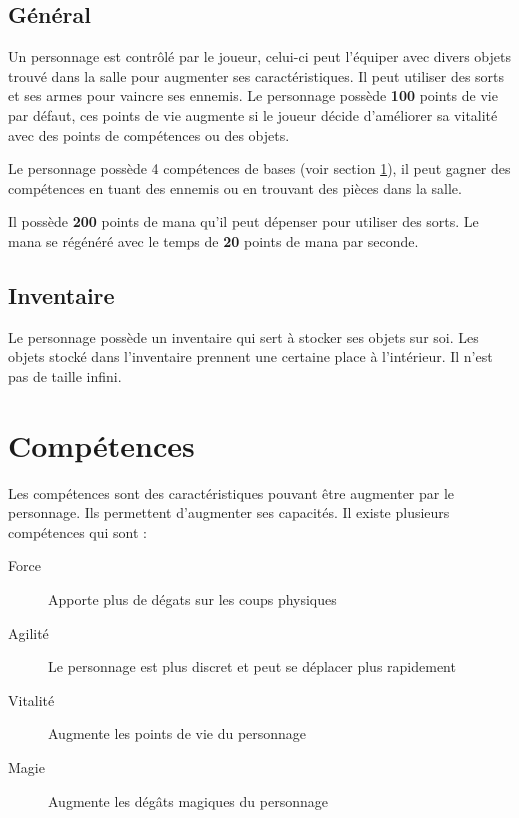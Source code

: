 \documentclass[11pt, a4paper, oneside]{report}
\begin{document}
\subsection{Général}
Un personnage est contrôlé par le joueur, celui-ci peut l'équiper avec divers objets trouvé dans la salle pour augmenter ses caractéristiques. Il peut utiliser des sorts et ses armes pour vaincre ses ennemis. Le personnage possède \textbf{100} points de vie par défaut, ces points de vie augmente si le joueur décide d'améliorer sa vitalité avec des points de compétences ou des objets.

Le personnage possède 4 compétences de bases (voir section \ref{sec:competences}), il peut gagner des compétences en tuant des ennemis ou en trouvant des pièces dans la salle.

Il possède \textbf{200} points de mana qu'il peut dépenser pour utiliser des sorts. Le mana se régénéré avec le temps de \textbf{20} points de mana par seconde. 
\subsection{Inventaire}
Le personnage possède un inventaire qui sert à stocker ses objets sur soi. Les objets stocké dans l'inventaire prennent une certaine place à l'intérieur. Il n'est pas de taille infini.
\section{Compétences}
\label{sec:competences}
Les compétences sont des caractéristiques pouvant être augmenter par le personnage. Ils permettent d'augmenter ses capacités. Il existe plusieurs compétences qui sont :

\begin{description}
	\item[Force] Apporte plus de dégats sur les coups physiques
	\item[Agilité] Le personnage est plus discret et peut se déplacer plus rapidement
	\item[Vitalité] Augmente les points de vie du personnage
	\item[Magie] Augmente les dégâts magiques du personnage
\end{description}
\end{document}
